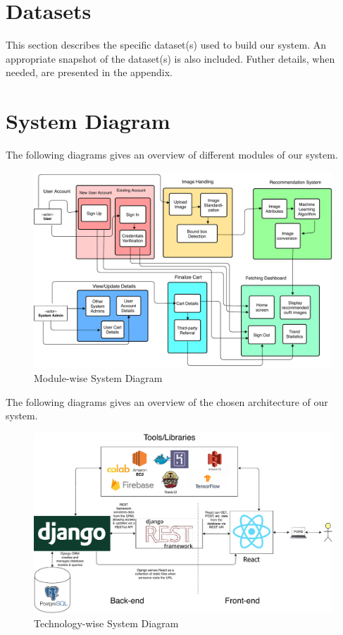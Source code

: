 \section{Datasets}
This section describes the specific dataset(s) used to build our system. An appropriate snapshot of the dataset(s) is also included. Futher details, when needed, are presented in the appendix.

\section{System Diagram}
The following diagrams gives an overview of different modules of our system.
\begin{figure}[ht]
\includegraphics[width=15cm]{images/systemDiagramModule.pdf} 
\centering
\caption{Module-wise System Diagram}
\end{figure}

The following diagrams gives an overview of the chosen architecture of our system.
\begin{figure}[ht]
\includegraphics[width=15cm]{images/systemDiagramTech.pdf} 
\centering
\caption{Technology-wise System Diagram}
\end{figure}


